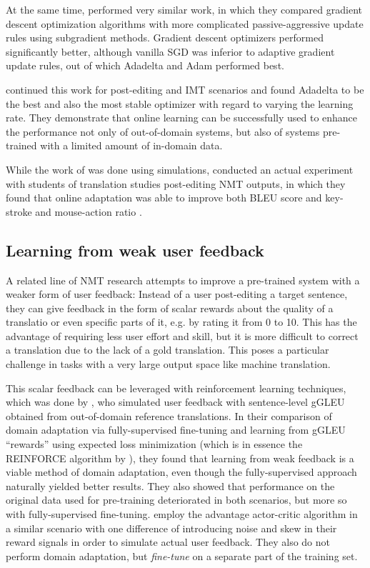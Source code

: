 At the same time, \textcite{peris-2017} performed very similar work, in which
they compared gradient descent optimization algorithms with more complicated
passive-aggressive update rules using subgradient methods. Gradient descent
optimizers performed significantly better, although vanilla SGD was inferior to
adaptive gradient update rules, out of which Adadelta and Adam performed best.

\textcite{peris-2019} continued this work for post-editing and IMT scenarios and
found Adadelta to be the best and also the most stable optimizer with regard to
varying the learning rate. They demonstrate that online learning can be
successfully used to enhance the performance not only of out-of-domain systems,
but also of systems pre-trained with a limited amount of in-domain data.

While the work of \textcites{turchi-2017}{peris-2017}{peris-2019} was done using
simulations, \textcite{karimova-2018} conducted an actual experiment with
students of translation studies post-editing NMT outputs, in which they found
that online adaptation was able to improve both BLEU score and key-stroke and
mouse-action ratio \parencite[for KSMR cf.][]{barrachina-2009}.

\subsection{Learning from weak user feedback}

A related line of NMT research attempts to improve a pre-trained system with a
weaker form of user feedback: Instead of a user post-editing a target sentence,
they can give feedback in the form of scalar rewards about the quality of a
translatio or even specific parts of it, e.g. by rating it from 0 to 10. This
has the advantage of requiring less user effort and skill, but it is more
difficult to correct a translation due to the lack of a gold translation.
This poses a particular challenge in tasks with a very large output space like
machine translation.

This scalar feedback can be leveraged with reinforcement learning techniques,
which was done by \textcite{kreutzer-2017}, who simulated user feedback with
sentence-level gGLEU \parencite{wu-2016} obtained from out-of-domain reference
translations. In their comparison of domain adaptation via fully-supervised
fine-tuning and learning from gGLEU \enquote{rewards} using expected loss
minimization (which is in essence the REINFORCE algorithm by
\textcite{williams-1992}), they found that learning from weak feedback is a
viable method of domain adaptation, even though the fully-supervised approach
naturally yielded better results. They also showed that performance on the
original data used for pre-training deteriorated in both scenarios, but more so
with fully-supervised fine-tuning. \textcite{nguyen-2017} employ the advantage
actor-critic algorithm \parencite{mnih-2016} in a similar scenario with one
difference of introducing noise and skew in their reward signals in order to
simulate actual user feedback. They also do not perform domain adaptation, but
\emph{fine-tune} on a separate part of the training set.


